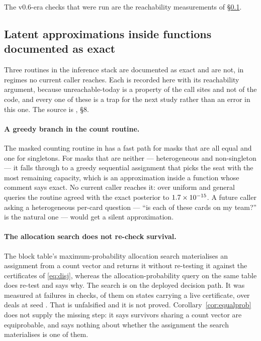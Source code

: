 The v0.6-era checks that were run are the reachability measurements of
\S\ref{app:inf-latent}.

\subsection{Latent approximations inside functions documented as exact}
\label{app:inf-latent}

Three routines in the inference stack are documented as exact and are not, in
regimes no current caller reaches. Each is recorded here with its reachability
argument, because unreachable-today is a property of the call sites and not of
the code, and every one of these is a trap for the next study rather than an
error in this one. The source is
, \S8.

\paragraph{A greedy branch in the count routine.} The masked counting routine in
 has a fast path for masks that are all equal and
one for singletons. For masks that are neither --- heterogeneous and
non-singleton --- it falls through to a greedy sequential assignment that picks
the seat with the most remaining capacity, which is an approximation inside a
function whose comment says exact. No current caller reaches it: over
\numCountUniformQueries{} uniform and \numCountGeneralQueries{} general queries
the routine agreed with the exact posterior to
$1.7\times10^{-15}{}$. A future caller asking a heterogeneous per-card question ---
``is each of these cards on my team?'' is the natural one --- would get a silent
approximation.

\paragraph{The allocation search does not re-check survival.} The block table's
maximum-probability allocation search materialises an assignment from a count
vector and returns it without re-testing it against the certificates of
\eqref{eq:disj}, whereas the allocation-probability query on the same table does
re-test and says why. The search is on the deployed decision path. It was
measured at \numAllocSurvivalFailures{} failures in \numAllocSurvivalChecks{}
checks, \numAllocSurvivalCert{} of them on states carrying a live certificate,
over \numAllocSurvivalDeals{} deals at seed \numAllocSurvivalSeed{}. That is
unfalsified and it is not proved. Corollary~\ref{cor:equalprob} does not supply
the missing step: it says survivors sharing a count vector are equiprobable, and
says nothing about whether the assignment the search materialises is one of them.

